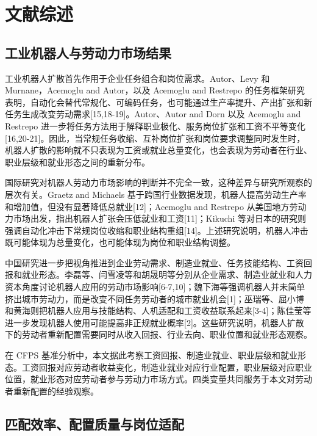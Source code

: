 \documentclass[UTF8, zihao=-4, a4paper, openany, fontset=none]{ctexrep}
\numberwithin{equation}{chapter}
\begin{document}
\chapter{文献综述}\label{ux6587ux732eux7efcux8ff0}

\section{工业机器人与劳动力市场结果}\label{ux5de5ux4e1aux673aux5668ux4ebaux4e0eux52b3ux52a8ux529bux5e02ux573aux7ed3ux679c}

工业机器人扩散首先作用于企业任务组合和岗位需求。Autor、Levy 和 Murnane，Acemoglu and Autor，以及 Acemoglu and Restrepo 的任务框架研究表明，自动化会替代常规化、可编码任务，也可能通过生产率提升、产出扩张和新任务生成改变劳动需求{[}15,18-19{]}。Autor、Autor and Dorn 以及 Acemoglu and Restrepo 进一步将任务方法用于解释职业极化、服务岗位扩张和工资不平等变化{[}16,20-21{]}。因此，当常规任务收缩、互补岗位扩张和岗位要求调整同时发生时，机器人扩散的影响就不只表现为工资或就业总量变化，也会表现为劳动者在行业、职业层级和就业形态之间的重新分布。

国际研究对机器人劳动力市场影响的判断并不完全一致，这种差异与研究所观察的层次有关。Graetz and Michaels 基于跨国行业数据发现，机器人提高劳动生产率和增加值，但没有显著降低总就业{[}12{]}；Acemoglu and Restrepo 从美国地方劳动力市场出发，指出机器人扩张会压低就业和工资{[}11{]}；Kikuchi 等对日本的研究则强调自动化冲击下常规岗位收缩和职业结构重组{[}14{]}。上述研究说明，机器人冲击既可能体现为总量变化，也可能体现为岗位和职业结构调整。

中国研究进一步把视角推进到企业劳动需求、制造业就业、任务技能结构、工资回报和就业形态。李磊等、闫雪凌等和胡晟明等分别从企业需求、制造业就业和人力资本角度讨论机器人应用的劳动市场影响{[}6-7,10{]}；魏下海等强调机器人并未简单挤出城市劳动力，而是改变不同任务劳动者的城市就业机会{[}1{]}；巫瑞等、屈小博和黄海则把机器人应用与技能结构、人机适配和工资收益联系起来{[}3-4{]}；陈佳莹等进一步发现机器人使用可能提高非正规就业概率{[}2{]}。这些研究说明，机器人扩散下的劳动者重新配置需要同时从收入回报、行业去向、职业位置和就业形态观察。

在 CFPS 基准分析中，本文据此考察工资回报、制造业就业、职业层级和就业形态。工资回报对应劳动者收益变化，制造业就业对应行业配置，职业层级对应职业位置，就业形态对应劳动者参与劳动力市场方式。四类变量共同服务于本文对劳动者重新配置的经验观察。

\section{匹配效率、配置质量与岗位适配}\label{ux5339ux914dux6548ux7387ux914dux7f6eux8d28ux91cfux4e0eux5c97ux4f4dux9002ux914d}
\end{document}
